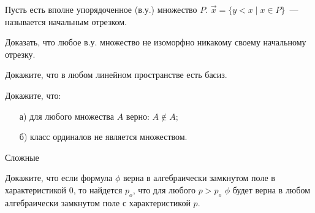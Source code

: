\breakline


Пусть есть вполне упорядоченное (в.у.) множество $P$. $\vec{x} = \{y < x \mid x \in P\}$~--- называется начальным отрезком. 

\begin{task}
    Доказать, что любое в.у. множество не изоморфно никакому своему начальному отрезку.
\end{task}

\begin{task}
    Докажите, что в любом линейном пространстве есть басиз.
\end{task}

\begin{task}
    Докажите, что:
	\begin{enumerate}[topsep = 0pt, itemsep = -1ex]
        \item [а)] для любого множества $A$ верно: $A \notin A$;
        \item [б)] класс ординалов не является множеством.
    \end{enumerate}
\end{task}


\breakline

Сложные

\begin{task}
    Докажите, что если формула $\phi$ верна в алгебраически замкнутом поле в характеристикой $0$, то найдется $p_o$, что для
    любого $p > p_o$ $\phi$ будет верна в любом алгебраически замкнутом поле с характеристикой $p$.
\end{task}
